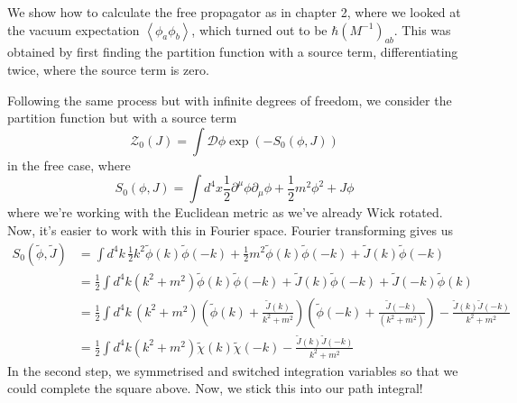 \documentclass[11pt, oneside]{article}   	%
\theoremstyle{slanted}
\begin{document}
We show how to calculate the free propagator 
as in chapter 2, where we 
looked at the vacuum expectation $ \left< \phi _ a \phi _ b  \right>$, 
which turned out to be $ \hbar \left( M ^{ -1 }  \right)_{ ab } $. 
This was obtained by first finding the partition function 
with a source term, differentiating twice, where
the source term is zero.

Following the same process but 
with infinite degrees of freedom, we 
consider the partition function 
but with a source term
\[
\mathcal{ Z } _ 0 \left( J  \right)   = 
\int \mathcal{ D } \phi \exp \left(  - S_ 0  \left( \phi , J \right)  \right) 
\] in the free case, 
where 
\[
S_0 \left( \phi , J  \right)   = 
\int d ^ 4 x \frac{1}{2 } \partial  ^ \mu \phi \partial  _ \mu \phi 
+ \frac{1}{2 }m ^ 2 \phi ^ 2 + J \phi 
\] where we're working with the Euclidean metric 
as we've already Wick rotated. 
Now, it's easier to work with this 
in Fourier space. Fourier transforming 
gives us 
\begin{align*}
S_0\left( \tilde{ \phi },  \tilde{ J }    \right)  &=  
\int d ^ 4 k \, \frac{1}{2 }k ^ 2 
\tilde{ \phi  }\left( k  \right)  \tilde{ \phi } \left( - k  \right)  
+ \frac{1}{2 } m ^ 2 \tilde{ \phi } \left( k   \right) 
\tilde{ \phi } \left( - k  \right)  + 
\tilde{ J } \left( k  \right)   \tilde{ \phi } \left( - k  \right)    \\ 
&=  \frac{1}{2 } 
\int d ^ 4 k \left( k ^ 2 + m ^2   \right) \tilde{ \phi } \left( k  \right)  \tilde{\phi  } 
\left( - k  \right)  + \tilde{J } \left( k  \right)  \tilde{ \phi } 
\left(  -k  \right)  + \tilde{ J } \left( -k   \right)  \tilde{ \phi } 
\left( k  \right) \\
&=  \frac{1}{2 } \int  d^ 4 k \, 
\left( k ^ 2 + m ^ 2   \right)  
\left( \tilde{ \phi } \left( k  \right) + \frac{ \tilde{J } \left( k \right)  }{
k ^ 2 + m ^  2 	 	 }   \right) \left( 
\tilde{ \phi } \left( -k   \right)  + \frac{ \tilde{ J } \left( - k   \right)   }{ 
\left( k^ 2 + m ^ 2  \right)  }  \right) - \frac{ \tilde{ J } \left( k  \right)  
\tilde{ J } \left( - k   \right)   }{ k ^2 + m ^ 2 }  \\
&=  \frac{1}{2 } \int d ^ 4 k \left( k ^ 2 + m ^ 2    \right)  
\tilde{ \chi } \left( k  \right)  \tilde{ \chi  } \left( -k   \right) - 
\frac{ \tilde{ J } \left( k  \right)  \tilde{ J } \left( -k  \right)    }{ 
k ^ 2 + m ^ 2 }
\end{align*}
In the second step, 
we symmetrised and switched integration variables 
so that we could complete the square above. 
Now, we stick this into our 
path integral! 
\end{document}
